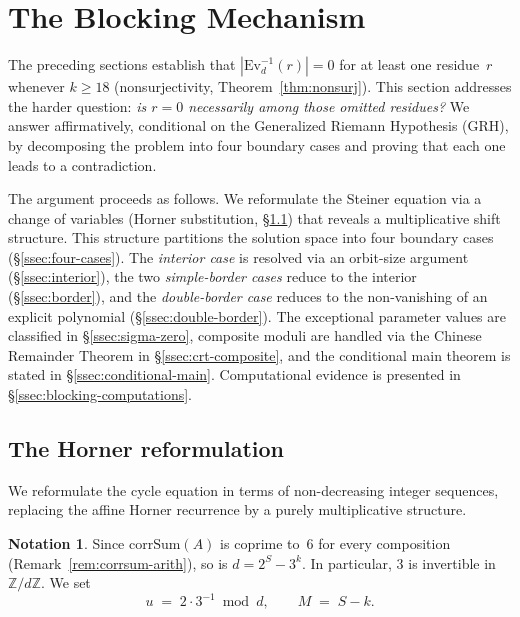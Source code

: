 \documentclass[12pt, a4paper]{amsart}
\theoremstyle{plain}
\theoremstyle{definition}
\newtheorem{notation}[theorem]{Notation}
\theoremstyle{remark}
\newcommand{\Z}{\mathbb{Z}}
\newcommand{\Ev}{\mathrm{Ev}}
\newcommand{\corrSum}{\mathrm{corrSum}}
\begin{document}
\section{The Blocking Mechanism}\label{sec:blocking}

The preceding sections establish that $|\Ev_d^{-1}(r)| = 0$
for at least one residue~$r$ whenever $k \geq 18$
(nonsurjectivity, Theorem~\ref{thm:nonsurj}).
This section addresses the harder question:
\emph{is $r = 0$ necessarily among those omitted residues?}
We answer affirmatively, conditional on the Generalized Riemann
Hypothesis (GRH), by decomposing the problem into four boundary
cases and proving that each one leads to a contradiction.

The argument proceeds as follows.
We reformulate the Steiner equation via a change of variables
(Horner substitution, \S\ref{ssec:horner}) that reveals a
multiplicative shift structure.
This structure partitions the solution space into four
boundary cases (\S\ref{ssec:four-cases}).
The \emph{interior case} is resolved via an orbit-size
argument (\S\ref{ssec:interior}), the two \emph{simple-border
cases} reduce to the interior (\S\ref{ssec:border}), and
the \emph{double-border case} reduces to the non-vanishing
of an explicit polynomial (\S\ref{ssec:double-border}).
The exceptional parameter values are classified in
\S\ref{ssec:sigma-zero}, composite moduli are handled via
the Chinese Remainder Theorem in \S\ref{ssec:crt-composite},
and the conditional main theorem is stated in
\S\ref{ssec:conditional-main}.
Computational evidence is presented in
\S\ref{ssec:blocking-computations}.

\subsection{The Horner reformulation}\label{ssec:horner}

We reformulate the cycle equation in terms of non-decreasing
integer sequences, replacing the affine Horner recurrence by
a purely multiplicative structure.

\begin{notation}\label{not:u-sub}
  Since $\corrSum(A)$ is coprime to~$6$ for every composition
  (Remark~\ref{rem:corrsum-arith}), so is $d = 2^S - 3^k$.
  In particular, $3$ is invertible in $\Z/d\Z$.
  We set
  \[
    u \;=\; 2 \cdot 3^{-1} \bmod d,
    \qquad
    M \;=\; S - k.
  \]
\end{notation}
\end{document}
